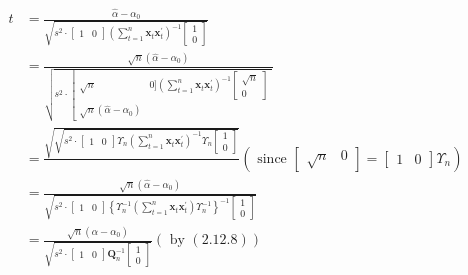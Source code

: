 \documentclass[10pt]{article}
\begin{document}
\begin{align*}
t & =\frac{\hat{\alpha}-\alpha_{0}}{\sqrt{s^{2} \cdot\left[\begin{array}{ll}
1 & 0
\end{array}\right]\left(\sum_{t=1}^{n} \mathbf{x}_{t} \mathbf{x}_{t}^{\prime}\right)^{-1}\left[\begin{array}{l}
1 \\
0
\end{array}\right]}} \\
& =\frac{\sqrt{n}\left(\hat{\alpha}-\alpha_{0}\right)}{\sqrt{s^{2} \cdot\left[\begin{array}{ll}
\sqrt{n} & 0]\left(\sum_{t=1}^{n} \mathbf{x}_{t} \mathbf{x}_{t}^{\prime}\right)^{-1}\left[\begin{array}{c}
\sqrt{n} \\
0
\end{array}\right] \\
\sqrt{n}\left(\hat{\alpha}-\alpha_{0}\right)
\end{array}\right.}} \\
& =\frac{\sqrt{\sqrt{s^{2} \cdot\left[\begin{array}{ll}
1 & 0
\end{array}\right] \Upsilon_{n}\left(\sum_{t=1}^{n} \mathbf{x}_{t} \mathbf{x}_{t}^{\prime}\right)^{-1} \Upsilon_{n}\left[\begin{array}{l}
1 \\
0
\end{array}\right]}}}{}\left(\text { since }\left[\begin{array}{ll}
\sqrt{n} & 0
\end{array}\right]=\left[\begin{array}{ll}
1 & 0
\end{array}\right] \Upsilon_{n}\right) \\
& =\frac{\sqrt{n}\left(\hat{\alpha}-\alpha_{0}\right)}{\sqrt{s^{2} \cdot\left[\begin{array}{ll}
1 & 0
\end{array}\right]\left\{\Upsilon_{n}^{-1}\left(\sum_{t=1}^{n} \mathbf{x}_{t} \mathbf{x}_{t}^{\prime}\right) \Upsilon_{n}^{-1}\right\}^{-1}\left[\begin{array}{l}
1 \\
0
\end{array}\right]}} \\
& =\frac{\sqrt{n}\left(\hat{\alpha}-\alpha_{0}\right)}{\sqrt{s^{2} \cdot\left[\begin{array}{ll}
1 & 0
\end{array}\right] \mathbf{Q}_{n}^{-1}\left[\begin{array}{l}
1 \\
0
\end{array}\right]}}(\text { by }(2.12 .8)) \tag{2.12.13}
\end{align*}
\end{document}
